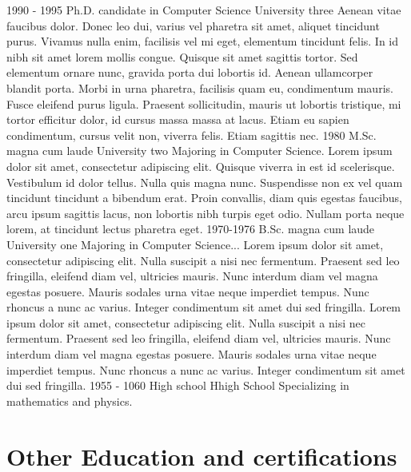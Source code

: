 \documentclass[letterpaper]{twentyonesecondcv} %
\begin{document}
{\begin{twenty}
  \twentyitem
    {1990 - 1995}
    {Ph.D. {\normalfont candidate in Computer Science}}
    {University three}
    {Aenean vitae faucibus dolor. Donec leo dui, varius vel pharetra sit amet, aliquet tincidunt purus. Vivamus nulla enim, facilisis vel mi eget, elementum tincidunt felis. In id nibh sit amet lorem mollis congue. Quisque sit amet sagittis tortor. Sed elementum ornare nunc, gravida porta dui lobortis id. Aenean ullamcorper blandit porta. Morbi in urna pharetra, facilisis quam eu, condimentum mauris. Fusce eleifend purus ligula. Praesent sollicitudin, mauris ut lobortis tristique, mi tortor efficitur dolor, id cursus massa massa at lacus. Etiam eu sapien condimentum, cursus velit non, viverra felis. Etiam sagittis nec.}
  \twentyitem
    {1980}
    {M.Sc. magna cum laude}
    {University two}
    {Majoring in Computer Science. Lorem ipsum dolor sit amet, consectetur adipiscing elit. Quisque viverra in est id scelerisque. Vestibulum id dolor tellus. Nulla quis magna nunc. Suspendisse non ex vel quam tincidunt tincidunt a bibendum erat. Proin convallis, diam quis egestas faucibus, arcu ipsum sagittis lacus, non lobortis nibh turpis eget odio. Nullam porta neque lorem, at tincidunt lectus pharetra eget.}
  \twentyitem
    {1970-1976}
    {B.Sc. magna cum laude}
    {University one}
    {Majoring in Computer Science... Lorem ipsum dolor sit amet, consectetur adipiscing elit. Nulla suscipit a nisi nec fermentum. Praesent sed leo fringilla, eleifend diam vel, ultricies mauris. Nunc interdum diam vel magna egestas posuere. Mauris sodales urna vitae neque imperdiet tempus. Nunc rhoncus a nunc ac varius. Integer condimentum sit amet dui sed fringilla. Lorem ipsum dolor sit amet, consectetur adipiscing elit. Nulla suscipit a nisi nec fermentum. Praesent sed leo fringilla, eleifend diam vel, ultricies mauris. Nunc interdum diam vel magna egestas posuere. Mauris sodales urna vitae neque imperdiet tempus. Nunc rhoncus a nunc ac varius. Integer condimentum sit amet dui sed fringilla.}
  \twentyitem
    {1955 - 1060}
    {High school}
    {Hhigh School}
    {Specializing in mathematics and physics.}
\end{twenty}

\section{Other Education and certifications}

}
\end{document}
